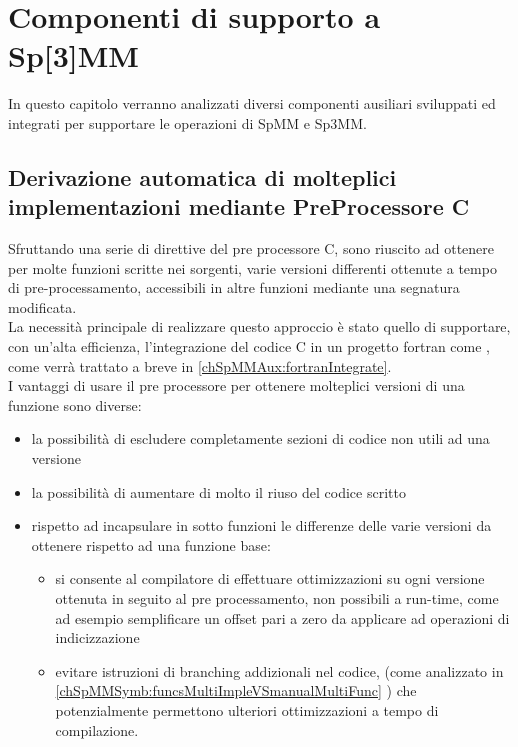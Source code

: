 \chapter{Componenti di supporto a Sp[3]MM}
In questo capitolo verranno analizzati diversi componenti ausiliari
sviluppati ed integrati per supportare le operazioni di SpMM e Sp3MM.\\
\section[Derivazione di molteplici implementazioni con PreProcessore C]	
{Derivazione automatica di molteplici implementazioni mediante PreProcessore C}	\label{chSpMMAux:multiImpl}
Sfruttando una serie di direttive del pre processore C, sono riuscito ad ottenere
per molte funzioni scritte nei sorgenti, varie versioni differenti ottenute a tempo di pre-processamento, 
accessibili in altre funzioni mediante una segnatura modificata.\\
La necessità principale di realizzare questo approccio è stato quello di supportare, con
un'alta efficienza, l'integrazione del codice C in un progetto fortran come \cite{PSBLAS3},
come verrà trattato a breve in \ref{chSpMMAux:fortranIntegrate}.\\
I vantaggi di usare il pre processore per ottenere molteplici versioni di una funzione sono diverse:
\begin{itemize}
	\item	la possibilità di escludere completamente sezioni di codice non utili ad una versione
	\item	la possibilità di aumentare di molto il riuso del codice scritto
	\item	rispetto ad incapsulare in sotto funzioni le differenze delle varie versioni da ottenere
			rispetto ad una funzione  base:
	\begin{itemize}
		\item	si consente al compilatore di effettuare ottimizzazioni 
				su ogni versione ottenuta in seguito al pre processamento, non possibili a run-time,
				come ad esempio semplificare un offset pari a zero da applicare ad operazioni di indicizzazione
		\item	evitare istruzioni di branching addizionali nel codice, (come analizzato in \ref{chSpMMSymb:funcsMultiImpleVSmanualMultiFunc} )
				che potenzialmente permettono ulteriori ottimizzazioni a tempo di compilazione.\\
	\end{itemize}
\end{itemize}
